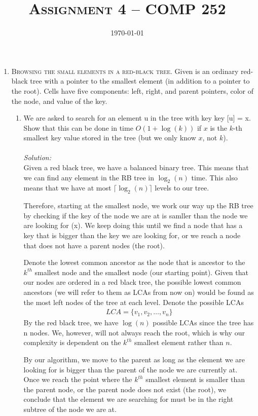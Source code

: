 \documentclass[12pt]{article}
\title{\textsc{Assignment 4 -- COMP 252}}
\author{\it \nameone \nametwo}
\date{\today}
\theoremstyle{definition}
\theoremstyle{remark}
\newcommand\sol{%
  \\ 
  \\
  \textit{Solution:}\\%
}
\begin{document}
\maketitle 
\thispagestyle{empty} %
\begin{enumerate}
  \item \textsc{Browsing the small elements in a red-black tree}. Given is an ordinary red-black tree with a pointer to the smallest element (in addition to a pointer to the root). Cells have five components: left, right, and parent pointers, color of the node, and value of the key.
\begin{enumerate}
  \item We are asked to search for an element u in the tree with key key [u] = x. Show that this can
be done in time $O(1 + \log(k))$ if $x$ is the $k$-th smallest key value stored in the tree (but we only know $x$, not $k$).
\sol
Given a red black tree, we have a balanced binary tree. This means that we can find any element in the RB tree in $\log_2(n)$ time. This also means that we have at most $\lceil \log_2(n)\rceil$ levels to our tree. 

Therefore, starting at the smallest node, we work our way up the RB tree by checking if the key of the node we are at is samller than the node we are looking for (x). We keep doing this until we find a node that has a key that is bigger than the key we are looking for, or we reach a node that does not have a parent nodes (the root). 


Denote the lowest common ancestor as the node that is ancestor to the $k^{th}$ smallest node and the smallest node (our starting point). Given that our nodes are ordered in a red black tree, the possible lowest common ancestors (we will refer to them as LCAs from now on) would be found as the most left nodes of the tree at each level. Denote the possible LCAs
\begin{align*}
    LCA = \{v_1, v_2, \ldots, v_{n}\}
\end{align*}
By the red black tree, we have $\log(n)$ possible LCAs since the tree has n nodes. We, however, will not always reach the root, which is why our complexity is dependent on the $k^{th}$ smallest element rather than $n$. 

By our algorithm, we move to the parent as long as the element we are looking for is bigger than the parent of the node we are currently at. Once we reach the point where the $k^{th}$ smallest element is smaller than the parent node, or the parent node does not exist (the root), we conclude that the element we are searching for must be in the right subtree of the node we are at. 


\end{enumerate}
\end{enumerate}
\end{document}
